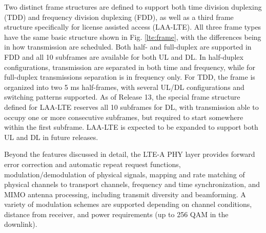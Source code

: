 Two distinct frame structures are defined to support both time division duplexing (TDD) and frequency division duplexing (FDD), as well as a third frame structure specifically for license assisted access (\mbox{LAA-LTE}).  All three frame types have the same basic structure shown in Fig. \ref{lte:frame}, with the differences being in how transmission are scheduled.  Both half- and full-duplex are supported in FDD and all 10 subframes are available for both UL and DL.  In half-duplex configurations, transmission are separated in both time and frequency, while for full-duplex transmissions separation is in frequency only.  For TDD, the frame is organized into two 5 ms half-frames, with several UL/DL configurations and switching patterns supported.  As of Release 13, the special frame structure defined for \mbox{LAA-LTE} reserves all 10 subframes for DL, with transmission able to occupy one or more consecutive subframes, but required to start somewhere within the first subframe. \mbox{LAA-LTE} is expected to be expanded to support both UL and DL in future releases.

Beyond the features discussed in detail, the \mbox{LTE-A} PHY layer provides forward error correction and automatic repeat request functions, modulation/demodulation of physical signals, mapping and rate matching of physical channels to transport channels, frequency and time synchronization, and MIMO antenna processing, including transmit diversity and beamforming.  A variety of modulation schemes are supported depending on channel conditions, distance from receiver, and power requirements (up to 256 QAM in the downlink).  

